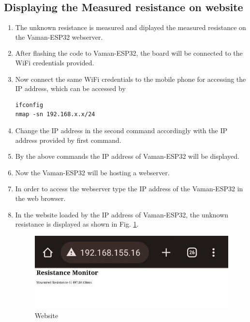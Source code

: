 \subsection{Displaying the Measured resistance on website}
\begin{enumerate}[label=\thesection.\arabic*.,ref=\thesection.\theenumi]
\item The unknown resistance is measured and diplayed the measured resistance on
the Vaman-ESP32 webserver.
\item After flashing the code to Vaman-ESP32, the board will be connected to the
WiFi credentials provided.
\item Now connect the same WiFi credentials to the mobile phone for accessing 
the IP address, which can be accessed by 
\begin{lstlisting}
ifconfig
nmap -sn 192.168.x.x/24
\end{lstlisting}
\item Change the IP address in the second command accordingly with the IP 
address provided by first command.
\item By the above commands the IP address of Vaman-ESP32 will be displayed.
\item Now the Vaman-ESP32 will be hosting a webserver.
\item In order to access the webserver type the IP address of the Vaman-ESP32 in
the web browser.
\item In the website loaded by the IP address of Vaman-ESP32, the unknown 
resistance is displayed as shown in Fig. \ref{fig:results1}.
\begin{figure}[!ht]
\centering
\includegraphics[width=\columnwidth]{vaman-esp32/spi-resistance/figs/result.jpg}
\caption{Website}
\label{fig:results1}
\end{figure}
\end{enumerate}
